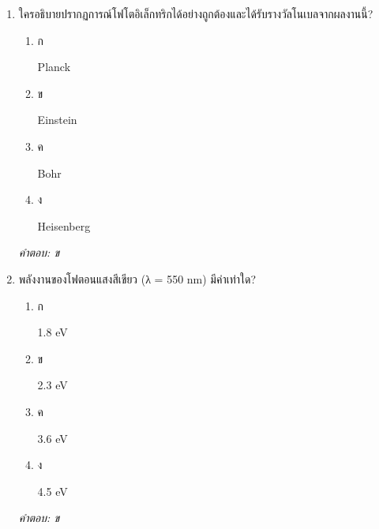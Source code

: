 \documentclass[12pt]{article}
\begin{document}
\begin{enumerate}[label=\arabic*., itemsep=0.5\baselineskip, topsep=0.5\baselineskip, leftmargin=*]
\item ใครอธิบายปรากฏการณ์โฟโตอิเล็กทริกได้อย่างถูกต้องและได้รับรางวัลโนเบลจากผลงานนี้?
\begin{enumerate}[label=\alph*)., itemsep=0.3\baselineskip, topsep=0.3\baselineskip]
\item ก\ 
\begin{minipage}[t]{0.9\linewidth}
\raggedright Planck
\end{minipage}
\item ข\ 
\begin{minipage}[t]{0.9\linewidth}
\raggedright Einstein
\end{minipage}
\item ค\ 
\begin{minipage}[t]{0.9\linewidth}
\raggedright Bohr
\end{minipage}
\item ง\ 
\begin{minipage}[t]{0.9\linewidth}
\raggedright Heisenberg
\end{minipage}
\end{enumerate}
\vspace{-0.3\baselineskip}
\begin{small}
\textit{คำตอบ: ข}
\end{small}

\item พลังงานของโฟตอนแสงสีเขียว (λ = 550 nm) มีค่าเท่าใด?
\begin{enumerate}[label=\alph*)., itemsep=0.3\baselineskip, topsep=0.3\baselineskip]
\item ก\ 
\begin{minipage}[t]{0.9\linewidth}
\raggedright 1.8 eV
\end{minipage}
\item ข\ 
\begin{minipage}[t]{0.9\linewidth}
\raggedright 2.3 eV
\end{minipage}
\item ค\ 
\begin{minipage}[t]{0.9\linewidth}
\raggedright 3.6 eV
\end{minipage}
\item ง\ 
\begin{minipage}[t]{0.9\linewidth}
\raggedright 4.5 eV
\end{minipage}
\end{enumerate}
\vspace{-0.3\baselineskip}
\begin{small}
\textit{คำตอบ: ข}
\end{small}


\end{enumerate}
\end{document}
